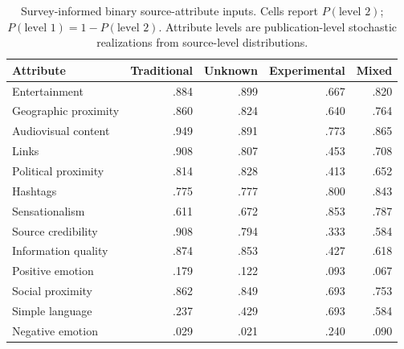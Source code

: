 \begin{table}[ht]
\centering
\caption{Survey-informed binary source-attribute inputs. Cells report $P(\text{level 2})$; $P(\text{level 1})=1-P(\text{level 2})$. Attribute levels are publication-level stochastic realizations from source-level distributions.}
\label{tab:source-attributes}
\small
\setlength{\tabcolsep}{5pt}
\begin{tabular}{lrrrr}
\toprule
Attribute & Traditional & Unknown & Experimental & Mixed \\
\midrule
Entertainment & .884 & .899 & .667 & .820 \\
Geographic proximity & .860 & .824 & .640 & .764 \\
Audiovisual content & .949 & .891 & .773 & .865 \\
Links & .908 & .807 & .453 & .708 \\
Political proximity & .814 & .828 & .413 & .652 \\
Hashtags & .775 & .777 & .800 & .843 \\
Sensationalism & .611 & .672 & .853 & .787 \\
Source credibility & .908 & .794 & .333 & .584 \\
Information quality & .874 & .853 & .427 & .618 \\
Positive emotion & .179 & .122 & .093 & .067 \\
Social proximity & .862 & .849 & .693 & .753 \\
Simple language & .237 & .429 & .693 & .584 \\
Negative emotion & .029 & .021 & .240 & .090 \\
\bottomrule
\end{tabular}
\end{table}
